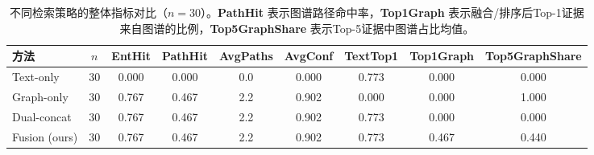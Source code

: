 \begin{table}[t]
  \centering
  \caption{不同检索策略的整体指标对比（$n=30$）。\textbf{PathHit} 表示图谱路径命中率，\textbf{Top1Graph} 表示融合/排序后Top-1证据来自图谱的比例，\textbf{Top5GraphShare} 表示Top-5证据中图谱占比均值。}
  \label{tab:qa_overall_metrics}
  \begin{tabular}{l S[table-format=2.0] S[table-format=1.3] S[table-format=1.3] S[table-format=1.1] S[table-format=1.3] S[table-format=1.3] S[table-format=1.3] S[table-format=1.3]}
    \toprule
    {方法} & {$n$} & {EntHit} & {PathHit} & {AvgPaths} & {AvgConf} & {TextTop1} & {Top1Graph} & {Top5GraphShare} \\
    \midrule
    Text-only        & 30 & 0.000 & 0.000 & 0.0 & 0.000 & 0.773 & 0.000 & 0.000 \\
    Graph-only       & 30 & 0.767 & 0.467 & 2.2 & 0.902 & 0.000 & 0.000 & 1.000 \\
    Dual-concat      & 30 & 0.767 & 0.467 & 2.2 & 0.902 & 0.773 & 0.000 & 0.000 \\
    Fusion (ours)    & 30 & 0.767 & 0.467 & 2.2 & 0.902 & 0.773 & 0.467 & 0.440 \\
    \bottomrule
  \end{tabular}
\end{table}

